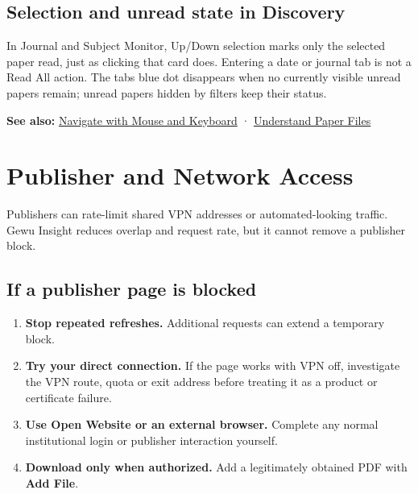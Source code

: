 \documentclass[10pt,letterpaper,oneside]{scrreprt}
\providecommand{\tightlist}{\setlength{\itemsep}{1pt}\setlength{\parskip}{0pt}}
\newenvironment{GewuRelated}{\par\nobreak\vspace{3pt}\nobreak\begingroup\small\sffamily\begin{samepage}\noindent}{\par\end{samepage}\endgroup}
\newenvironment{GewuLead}
  {\begin{list}{}{\leftmargin=0pt\rightmargin=0pt\topsep=0pt\partopsep=0pt\parsep=0pt}\item\relax
    \sffamily\fontsize{10.5}{13.2}\selectfont\color{GewuMuted}}
  {\end{list}}
\begin{document}
\section{Selection and unread state in Discovery}\label{selection-and-unread-state-in-discovery}

In Journal and Subject Monitor, Up/Down selection marks only the selected paper read, just as clicking that card does. Entering a date or journal tab is not a Read All action. The tab\textquotesingle s blue dot disappears when no currently visible unread papers remain; unread papers hidden by filters keep their status.

\begin{GewuRelated}
\textbf{See also:} \hyperref[navigation]{Navigate with Mouse and Keyboard} · \hyperref[paper-files]{Understand Paper Files}
\end{GewuRelated}

\chapter{Publisher and Network Access}\label{network-access}

\begin{GewuLead}
Publishers can rate-limit shared VPN addresses or automated-looking traffic. Gewu Insight reduces overlap and request rate, but it cannot remove a publisher block.
\end{GewuLead}

\section{If a publisher page is blocked}\label{if-a-publisher-page-is-blocked}

\begin{enumerate}
\tightlist
\item
  \textbf{Stop repeated refreshes.} Additional requests can extend a temporary block.
\item
  \textbf{Try your direct connection.} If the page works with VPN off, investigate the VPN route, quota or exit address before treating it as a product or certificate failure.
\item
  \textbf{Use \textbf{Open Website} or an external browser.} Complete any normal institutional login or publisher interaction yourself.
\item
  \textbf{Download only when authorized.} Add a legitimately obtained PDF with \textbf{Add File}.
\end{enumerate}
\end{document}
